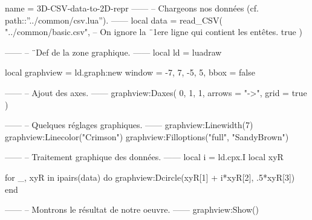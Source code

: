 \documentclass[border = 3pt]{standalone}
\begin{document}
\begin{luadraw*}{name = 3D-CSV-data-to-2D-repr}
------
-- Chargeons nos données (cf. path::''../common/csv.lua'').
------
local data = read_CSV(
  "../common/basic.csv",
-- On ignore la ¨1ere ligne qui contient les entêtes.
  true
)

------
-- ¨Def de la zone graphique.
------
local ld = luadraw

local graphview = ld.graph:new{
  window = {-7, 7, -5, 5},
  bbox   = false
}

------
-- Ajout des axes.
------
graphview:Daxes(
  {0, 1, 1},
  {
    arrows = "->",
    grid   = true
  }
)

------
-- Quelques réglages graphiques.
------
graphview:Linewidth(7)
graphview:Linecolor("Crimson")
graphview:Filloptions("full", "SandyBrown")

------
-- Traitement graphique des données.
------
local i = ld.cpx.I
local xyR

for _, xyR in ipairs(data) do
  graphview:Dcircle(xyR[1] + i*xyR[2], .5*xyR[3])
end

------
-- Montrons le résultat de notre oeuvre.
------
graphview:Show()
\end{luadraw*}
\end{document}
